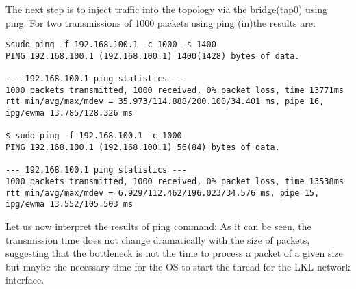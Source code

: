 The next step is to inject traffic into the topology via the bridge(tap0) using ping.
For two transmissions of 1000 packets using ping (in)the results are:
\lstset{language=Tex, caption=}
\begin{lstlisting}
$sudo ping -f 192.168.100.1 -c 1000 -s 1400
PING 192.168.100.1 (192.168.100.1) 1400(1428) bytes of data.
                
--- 192.168.100.1 ping statistics ---
1000 packets transmitted, 1000 received, 0% packet loss, time 13771ms
rtt min/avg/max/mdev = 35.973/114.888/200.100/34.401 ms, pipe 16, ipg/ewma 13.785/128.326 ms

$ sudo ping -f 192.168.100.1 -c 1000 
PING 192.168.100.1 (192.168.100.1) 56(84) bytes of data.
               
--- 192.168.100.1 ping statistics ---
1000 packets transmitted, 1000 received, 0% packet loss, time 13538ms
rtt min/avg/max/mdev = 6.929/112.462/196.023/34.576 ms, pipe 15, ipg/ewma 13.552/105.503 ms
\end{lstlisting}
Let us now interpret the results of ping command:
As it can be seen, the transmission time does not change dramatically with the size of packets, suggesting that the bottleneck is not the time to process a packet of a given size but maybe the necessary time for the OS to start the thread for the LKL network interface.
